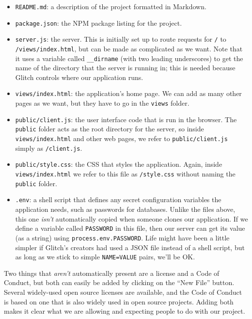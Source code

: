 \begin{itemize}
\item
  \texttt{README.md}: a description of the project formatted in Markdown.
\item
  \texttt{package.json}: the NPM package listing for the project.
\item
  \texttt{server.js}: the server.
  This is initially set up to route requests for \texttt{/} to \texttt{/views/index.html},
  but can be made as complicated as we want.
  Note that it uses a variable called \texttt{\_\_dirname} (with two leading underscores)
  to get the name of the directory that the server is running in;
  this is needed because Glitch controls where our application runs.
\item
  \texttt{views/index.html}: the application's home page.
  We can add as many other pages as we want,
  but they have to go in the \texttt{views} folder.
\item
  \texttt{public/client.js}: the user interface code that is run in the browser.
  The \texttt{public} folder acts as the root directory for the server,
  so inside \texttt{views/index.html} and other web pages,
  we refer to \texttt{public/client.js} simply as \texttt{/client.js}.
\item
  \texttt{public/style.css}: the CSS that styles the application.
  Again,
  inside \texttt{views/index.html} we refer to this file as \texttt{/style.css}
  without naming the \texttt{public} folder.
\item
  \texttt{.env}: a shell script that defines any secret configuration variables the application needs,
  such as passwords for databases.
  Unlike the files above,
  this one \emph{isn't} automatically copied when someone clones our application.
  If we define a variable called \texttt{PASSWORD} in this file,
  then our server can get its value (as a string) using \texttt{process.env.PASSWORD}.
  Life might have been a little simpler if Glitch's creators had used a JSON file instead of a shell script,
  but as long as we stick to simple \texttt{NAME=VALUE} pairs,
  we'll be OK.
\end{itemize}


Two things that \emph{aren't} automatically present are a license and a Code of Conduct,
but both can easily be added by clicking on the ``New File'' button.
Several widely-used open source licenses are available,
and the Code of Conduct is based on one that is also widely used in open source projects.
Adding both makes it clear what we are allowing and expecting people to do with our project.

